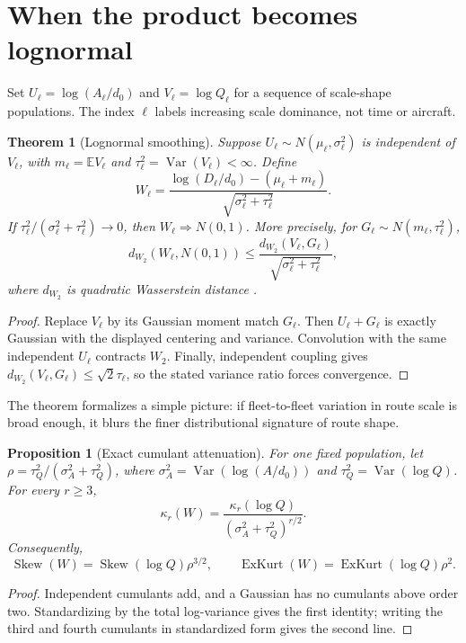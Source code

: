 \documentclass[10pt]{article}
\theoremstyle{aerostat}
\newtheorem{theorem}{Theorem}
\newtheorem{proposition}{Proposition}
\newcommand{\E}{\mathbb E}
\newcommand{\Var}{\operatorname{Var}}
\newcommand{\Skew}{\operatorname{Skew}}
\newcommand{\ExKurt}{\operatorname{ExKurt}}
\begin{document}
\section{When the product becomes lognormal}

Set $U_\ell=\log(A_\ell/d_0)$ and $V_\ell=\log Q_\ell$ for a sequence of scale-shape populations. The index $\ell$ labels increasing scale dominance, not time or aircraft.

\begin{theorem}[Lognormal smoothing]
Suppose $U_\ell\sim N(\mu_\ell,\sigma_\ell^2)$ is independent of $V_\ell$, with $m_\ell=\E V_\ell$ and $\tau_\ell^2=\Var(V_\ell)<\infty$. Define
\[
W_\ell=\frac{\log(D_\ell/d_0)-(\mu_\ell+m_\ell)}
{\sqrt{\sigma_\ell^2+\tau_\ell^2}}.
\]
If $\tau_\ell^2/(\sigma_\ell^2+\tau_\ell^2)\to0$, then $W_\ell\Rightarrow N(0,1)$. More precisely, for $G_\ell\sim N(m_\ell,\tau_\ell^2)$,
\[
d_{W_2}\!\left(W_\ell,N(0,1)\right)
\leq
\frac{d_{W_2}(V_\ell,G_\ell)}{\sqrt{\sigma_\ell^2+\tau_\ell^2}},
\]
where $d_{W_2}$ is quadratic Wasserstein distance \cite{villani2009}.
\end{theorem}

\begin{proof}
Replace $V_\ell$ by its Gaussian moment match $G_\ell$. Then $U_\ell+G_\ell$ is exactly Gaussian with the displayed centering and variance. Convolution with the same independent $U_\ell$ contracts $W_2$. Finally, independent coupling gives $d_{W_2}(V_\ell,G_\ell)\leq\sqrt{2}\tau_\ell$, so the stated variance ratio forces convergence.
\end{proof}

The theorem formalizes a simple picture: if fleet-to-fleet variation in route scale is broad enough, it blurs the finer distributional signature of route shape.

\begin{proposition}[Exact cumulant attenuation]
For one fixed population, let $\rho=\tau_Q^2/(\sigma_A^2+\tau_Q^2)$, where $\sigma_A^2=\Var(\log(A/d_0))$ and $\tau_Q^2=\Var(\log Q)$. For every $r\geq3$,
\[
\kappa_r(W)=\frac{\kappa_r(\log Q)}{(\sigma_A^2+\tau_Q^2)^{r/2}}.
\]
Consequently,
\[
\Skew(W)=\Skew(\log Q)\rho^{3/2},
\qquad
\ExKurt(W)=\ExKurt(\log Q)\rho^2.
\]
\end{proposition}

\begin{proof}
Independent cumulants add, and a Gaussian has no cumulants above order two. Standardizing by the total log-variance gives the first identity; writing the third and fourth cumulants in standardized form gives the second line.
\end{proof}
\end{document}
